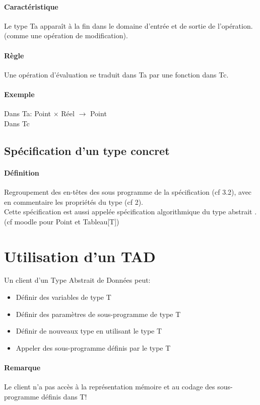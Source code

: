 					\paragraph{Caractéristique}
						Le type Ta apparaît à la fin dans le domaine d'entrée et de sortie de l'opération.
						(comme une opération de modification).
					\paragraph{Règle}
						Une opération d'évaluation se traduit dans Ta par une fonction dans Tc.
					\paragraph{Exemple}
						Dans Ta: Point $\times$ Réel $\rightarrow$ Point\\
						Dans Tc
						
				\subsection{Spécification d'un type concret}
					\paragraph{Définition}
						Regroupement des en-têtes des sous programme de la spécification (cf 3.2), avec
						en commentaire les propriétés du type (cf 2). \\
						Cette spécification est aussi appelée spécification algorithmique du type abstrait
						. (cf moodle pour Point et Tableau[T])
\section{Utilisation d'un TAD}
		Un client d'un Type Abstrait de Données peut:
			\begin{itemize}	
				\item Définir des variables de type T
				\item Définir des paramètres de sous-programme de type T
				\item Définir de nouveaux type en utilisant le type T
				\item Appeler des sous-programme définis par le type T
			\end{itemize}
			\paragraph{Remarque}
				Le client n'a pas accès à la représentation mémoire et au codage des sous-programme définis
				dans T!
